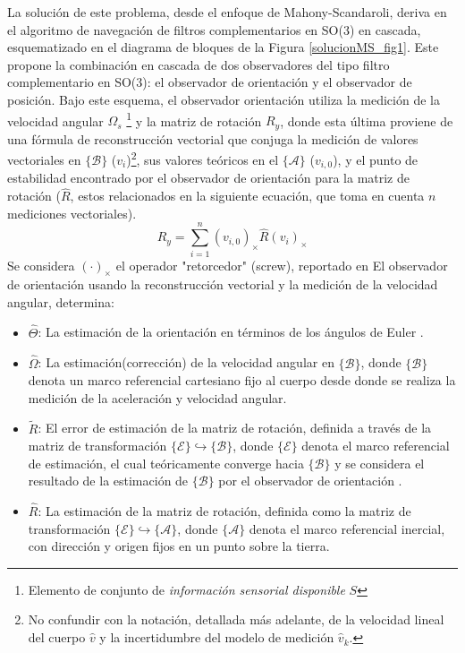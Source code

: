 \documentclass[conference]{IEEEtran}
\newcommand{\marco}[1]{\{\mathcal{#1}\}}
\begin{document}
La solución de este problema, desde el enfoque de Mahony-Scandaroli, deriva en el algoritmo de navegación de filtros complementarios en SO(3) en cascada, esquematizado en el diagrama de bloques de la Figura \ref{solucionMS_fig1}. 
Este propone la combinación en cascada de dos observadores del tipo filtro complementario en SO(3): el observador de orientación y el observador de posición. Bajo este esquema, el observador orientación utiliza la medición de la velocidad angular $\Omega_s$ \footnote{ Elemento de conjunto de \emph{información sensorial disponible} $S$} y la matriz de rotación $R_y$, donde esta última proviene de una fórmula de reconstrucción vectorial que conjuga la medición de valores vectoriales en $\marco{B}$ ($v_i$)\footnote{No confundir con la notación, detallada más adelante, de la velocidad lineal del cuerpo $\hat{v}$ y la incertidumbre del modelo de medición $\hat{v}_k$.}, sus valores teóricos en el $\marco{A}$ ($v_{i,0}$), y el punto de estabilidad encontrado por el observador de orientación para la matriz de rotación ($\hat{R}$, estos relacionados en la siguiente ecuación, que toma en cuenta $n$ mediciones vectoriales).
\begin{equation}\label{ReconstruccionVectorial}
R_y=\sum_{i=1}^{n}(v_{i,0})_\times\hat{R}(v_i)_\times
\end{equation}
Se considera $(\cdot)_\times$ el operador "retorcedor" (screw), reportado en \cite{Mahony2008}
El observador de orientación usando la reconstrucción vectorial y la medición de la velocidad angular, determina:
\begin{itemize}
\item $\hat{\Theta}$: La estimación de la orientación en términos de los ángulos de Euler .
\item $\hat{\Omega}$: La estimación(corrección) de la velocidad angular en $\marco{B}$, donde $\marco{B}$ denota un marco referencial cartesiano fijo al cuerpo desde donde se realiza la medición de la aceleración y velocidad angular.
\item $\tilde{R}$: El error de estimación de la matriz de rotación, definida a través de la matriz de transformación $\marco{E}\hookrightarrow\marco{B}$, donde $\marco{E}$ denota el marco referencial de estimación, el cual teóricamente converge hacia $\marco{B}$ y se considera el resultado de la estimación de $\marco{B}$ por el observador de orientación .
\item $\hat{R}$: La estimación de la matriz de rotación, definida como la matriz de transformación $ \marco{E}\hookrightarrow\marco{A}$, donde $\marco{A}$ denota el marco referencial inercial, con dirección y origen fijos en un punto sobre la tierra.
\end{itemize}
\end{document}

